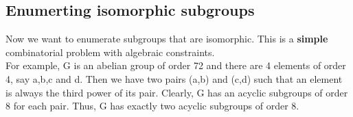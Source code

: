 \documentclass{article}
\begin{document}
\subsection{Enumerting isomorphic subgroups}
Now we want to enumerate subgroups that are isomorphic. This is a \textbf{simple} combinatorial problem with algebraic constraints.\\ For example, G is an abelian group of order 72 and there are 4 elements of order 4, say a,b,c and d. Then we have two pairs (a,b) and (c,d) such that an element is always the third power of its pair. Clearly, G has an acyclic subgroups of order 8 for each pair. Thus, G has exactly two acyclic subgroups of order 8.
\end{document}
